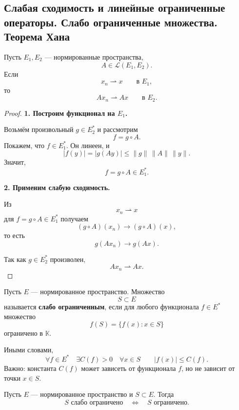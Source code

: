 \providecommand{\weakconv}{\rightharpoonup}
\providecommand{\K}{\mathbb{K}}

\subsection{Слабая сходимость и линейные ограниченные операторы. Слабо ограниченные множества. Теорема Хана}

\begin{theorem}
	Пусть \(E_1,E_2\) --- нормированные пространства,
	\[
	A\in \mathcal{L}(E_1,E_2).
	\]
	Если
	\[
	x_n\weakconv x
	\qquad \text{в } E_1,
	\]
	то
	\[
	Ax_n\weakconv Ax
	\qquad \text{в } E_2.
	\]
\end{theorem}

\begin{proof}
	\textbf{1. Построим функционал на \(E_1\).}
	
	Возьмём произвольный \(g\in E_2^*\) и рассмотрим
	\[
	f=g\circ A.
	\]
	Покажем, что \(f\in E_1^*\). Он линеен, и
	\[
	|f(y)|
	=
	|g(Ay)|
	\leqslant
	\|g\|\,\|A\|\,\|y\|.
	\]
	Значит,
	\[
	f=g\circ A\in E_1^*.
	\]
	
	\textbf{2. Применим слабую сходимость.}
	
	Из
	\[
	x_n\weakconv x
	\]
	для \(f=g\circ A\in E_1^*\) получаем
	\[
	(g\circ A)(x_n)\to(g\circ A)(x),
	\]
	то есть
	\[
	g(Ax_n)\to g(Ax).
	\]
	
	Так как \(g\in E_2^*\) произволен,
	\[
	Ax_n\weakconv Ax.
	\]
\end{proof}

\begin{definition}
	Пусть \(E\) --- нормированное пространство. Множество
	\[
	S\subset E
	\]
	называется \textbf{слабо ограниченным}, если для любого функционала
	\(f\in E^*\) множество
	\[
	f(S)=\{f(x):x\in S\}
	\]
	ограничено в \(\K\).
	
	Иными словами,
	\[
	\forall f\in E^*
	\quad
	\exists C(f)>0
	\quad
	\forall x\in S
	\qquad
	|f(x)|\leqslant C(f).
	\]
	Важно: константа \(C(f)\) может зависеть от функционала \(f\), но не зависит от точки \(x\in S\).
\end{definition}

\begin{theorem}[Хана]
	Пусть \(E\) --- нормированное пространство и \(S\subset E\). Тогда
	\[
	S \text{ слабо ограничено}
	\quad\Longleftrightarrow\quad
	S \text{ ограничено}.
	\]
\end{theorem}

